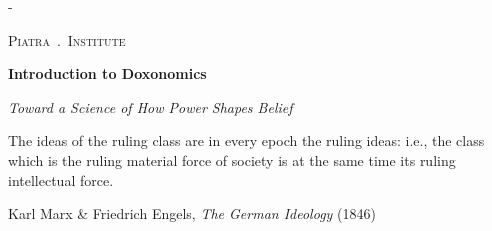 \begin{titlingpage}
\calccentering{\unitlength}
\begin{adjustwidth*}{\unitlength}{-\unitlength}
\centering

\vspace*{2cm}

{\large\scshape Piatra \,.\, Institute}

\vspace{3cm}

{\Huge\bfseries Introduction to Doxonomics}

\vspace{0.8cm}

{\Large\itshape Toward a Science of How Power Shapes Belief}

\vspace{4cm}

\epigraph{The ideas of the ruling class are in every epoch the ruling ideas: i.e., the class which is the ruling material force of society is at the same time its ruling intellectual force.}{Karl Marx \& Friedrich Engels, \textit{The German Ideology} (1846)}

\vfill

{\large\the\year}

\end{adjustwidth*}
\end{titlingpage}
